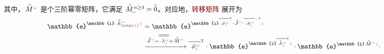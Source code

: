 其中，$\Xint{\mathcolor{gray}{-}}{18}{\bar{\bar{M}}}^{\;\!\mathcolor{gray}{\omega}}$ 是个三阶\textcolor{PineGreen}{幂零矩阵}，它满足 $\Xint{\mathcolor{gray}{-}}{18}{\bar{\bar{M}}}_{\mathcolor{gray}{\omega}}^{\;\! n \geq 3} = \bar{\bar{0}}$。对应地，\textcolor{Maroon}{转移矩阵} 展开为
\begin{subequations}
\begin{align}
	\mathbb{e}^{\mathbb{i} \Xint{\begin{smallmatrix} ~ \\ {}^{}_{\mathcolor{gray}{-}} \\ ~ \end{smallmatrix}}{15}{\bar{\bar{k}}}_{\textcolor{Maroon}{\symup{z}}}^{\;\! \mathcolor{gray}{\omega}} \mathcolor{gray}{z}} &= \mathbb{e}^{\mathbb{i} \overline{\Xint{\begin{smallmatrix} ~ \\ {}^{}_{\mathcolor{gray}{-}} \\ ~ \end{smallmatrix}}{15}{\bar{\nu}}^{\;\!\mathcolor{gray}{\omega}}_{\textcolor{PineGreen}{\imath}}}^{\mathsf{\textcolor{Plum}{T}}} \cdot \Xint{\mathcolor{gray}{-}}{25}{\bar{\bar{J}}}^{\;\!\mathcolor{gray}{\omega}} \cdot \overline{\Xint{\begin{smallmatrix} ~ \\ {}^{}_{\mathcolor{gray}{-}} \\ ~ \end{smallmatrix}}{15}{\bar{\nu}}^{\;\!\mathcolor{gray}{\omega}}_{\textcolor{PineGreen}{l}}}^{-{\mathsf{\textcolor{Plum}{T}}}} \mathcolor{gray}{z}} \label{eq:e^ikzz-Jordan_decompose} \\ &\xrightarrow[]{\Xint{\mathcolor{gray}{-}}{25}{\bar{\bar{J}}}^{\;\!\mathcolor{gray}{\omega}} = \overline{\overline{\Xint{\begin{smallmatrix} ~ \\ {}^{}_{\mathcolor{gray}{-}} \\ ~ \end{smallmatrix}}{22}{\lambda}^{\;\!\mathcolor{gray}{\omega}}_{\textcolor{PineGreen}{\jmath}}}} + \Xint{\mathcolor{gray}{-}}{18}{\bar{\bar{M}}}^{\;\!\mathcolor{gray}{\omega}}} \overline{\Xint{\begin{smallmatrix} ~ \\ {}^{}_{\mathcolor{gray}{-}} \\ ~ \end{smallmatrix}}{15}{\bar{\nu}}^{\;\!\mathcolor{gray}{\omega}}_{\textcolor{PineGreen}{\imath}}}^{{\mathsf{\textcolor{Plum}{T}}}} \cdot \mathbb{e}^{\mathbb{i} \overline{\Xint{\begin{smallmatrix} ~ \\ {}^{}_{\mathcolor{gray}{-}} \\ ~ \end{smallmatrix}}{22}{\bar{\lambda}}^{\;\!\mathcolor{gray}{\omega}}_{\textcolor{PineGreen}{\jmath}}}^{{\mathsf{\textcolor{Plum}{T}}}} \mathcolor{gray}{z}} \cdot \mathbb{e}^{\mathbb{i} \Xint{\mathcolor{gray}{-}}{18}{\bar{\bar{M}}}^{\;\!\mathcolor{gray}{\omega}} \mathcolor{gray}{z}} \cdot 
\end{align}
\end{subequations}

